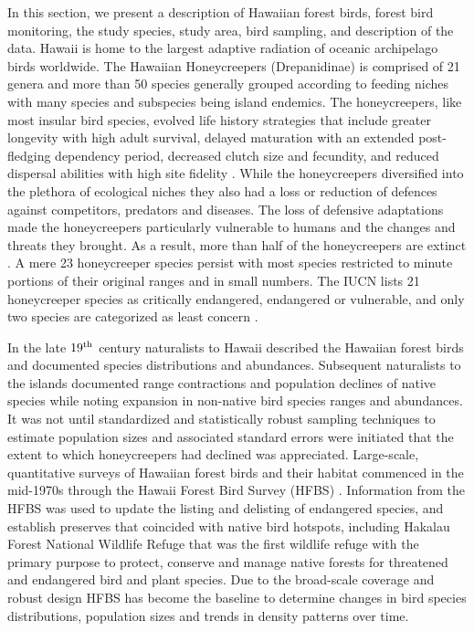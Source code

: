 \documentclass[preprint,12pt]{elsarticle}
\newcommand{\hawaii}{Hawai\textquotesingle i}   %
\begin{document}
In this section, we present a description of Hawaiian forest birds, forest bird monitoring, the study species, study area, bird sampling, and description of the data. \hawaii{} is home to the largest adaptive radiation of oceanic archipelago birds worldwide. The Hawaiian Honeycreepers (Drepanidinae) is comprised of 21 genera and more than 50 species generally grouped according to feeding niches with many species and subspecies being island endemics. The honeycreepers, like most insular bird species, evolved life history strategies that include greater longevity with high adult survival, delayed maturation with an extended post-fledging dependency period, decreased clutch size and fecundity, and reduced dispersal abilities with high site fidelity \citep{woodworth_demography_2009}. While the honeycreepers diversified into the plethora of ecological niches they also had a loss or reduction of defences against competitors, predators and diseases. The loss of defensive adaptations made the honeycreepers particularly vulnerable to humans and the changes and threats they brought. As a result, more than half of the honeycreepers are extinct \citep{banko_extinctions_2009}. A mere 23 honeycreeper species persist with most species restricted to minute portions of their original ranges and in small numbers. The IUCN lists 21 honeycreeper species as critically endangered, endangered or vulnerable, and only two species are categorized as least concern \citep{iucn_redlist_2018}.

In the late $19^{\textnormal{th}}$ century naturalists to \hawaii{} described the Hawaiian forest birds and documented species distributions and abundances. Subsequent naturalists to the islands documented range contractions and population declines of native species while noting expansion in non-native bird species ranges and abundances. It was not until standardized and statistically robust sampling techniques to estimate population sizes and associated standard errors were initiated that the extent to which honeycreepers had declined was appreciated. Large-scale, quantitative surveys of Hawaiian forest birds and their habitat commenced in the mid-1970s through the Hawaii Forest Bird Survey (HFBS) \citep{scott_HFBS_1986}. Information from the HFBS was used to update the listing and delisting of endangered species, and establish preserves that coincided with native bird hotspots, including Hakalau Forest National Wildlife Refuge that was the first wildlife refuge with the primary purpose to protect, conserve and manage native forests for threatened and endangered bird and plant species. Due to the broad-scale coverage and robust design HFBS has become the baseline to determine changes in bird species distributions, population sizes and trends in density patterns over time.
\end{document}
